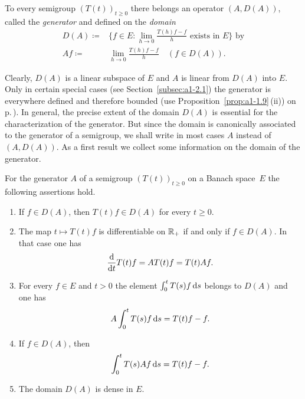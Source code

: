 \begin{definition}\label{def:a1-1.5}
To every semigroup $(T(t))_{t \geq 0}$ there belongs an operator $(A,D(A))$, called the \emph{generator} and defined on the \emph{domain}
\begin{align*}
	D(A) \coloneqq{} & \{f \in E \colon \lim_{h\to0} \frac{T(h)f - f}{h} \text{ exists in $E$}\} \text{ by} \\
	Af \coloneqq{} & \lim_{h\to0} \frac{T(h)f - f}{h} \quad (f \in D(A)).
\end{align*}
\end{definition}
Clearly, $D(A)$ is a linear subspace of $E$ and $A$ is linear from $D(A)$ into $E$.
Only in certain special cases (see Section~\ref{subsec:a1-2.1}) the generator
is everywhere defined and therefore bounded (use Proposition~\ref{prop:a1-1.9}\,(ii)) on p.\,\pageref{prop:a1-1.9}). 
In general, the precise extent of the domain $D(A)$ is essential for the characterization of the generator.
But since the domain is canonically associated to the generator of a semigroup, we shall write in most cases $A$ instead of $(A,D(A))$.
As a first result we collect some information on the domain of the generator.
\begin{proposition}\label{prop:a1-1.6}
For the generator $A$ of a semigroup $(T(t))_{t \geq 0}$ on a Banach space~$E$ the following assertions hold.
\begin{enumerate}[\upshape(i)]
\item
If $f \in D(A)$, then $T(t)f \in D(A)$ for every $t \geq 0$.

\item
The map $t \mapsto T(t)f$ is differentiable on $\mathbb{R}_{+}$ if and only if $f \in D(A)$.
In that case one has
\begin{equation}\label{eq:a1-1.2}
    \frac{\mathop{}\!\mathrm{d}{}}{\mathop{}\!\mathrm{d}{t}} T(t)f = AT(t)f = T(t)Af .
\end{equation}
\item
For every $f \in E$ and $t > 0$ the element $\int_0^t T(s)f \mathop{}\!\mathrm{d}{s}$ belongs to $D(A)$ and one has
\begin{equation}\label{eq:a1-1.3}
    A\int_0^t T(s)f \mathop{}\!\mathrm{d}{s} = T(t)f - f  .
\end{equation}
\item
If $f \in D(A)$, then
\begin{equation}\label{eq:a1-1.4}
    \int_0^t T(s)Af \mathop{}\!\mathrm{d}{s} = T(t)f - f  .
\end{equation}

\item
The domain $D(A)$ is dense in $E$.
\end{enumerate}
\end{proposition}
